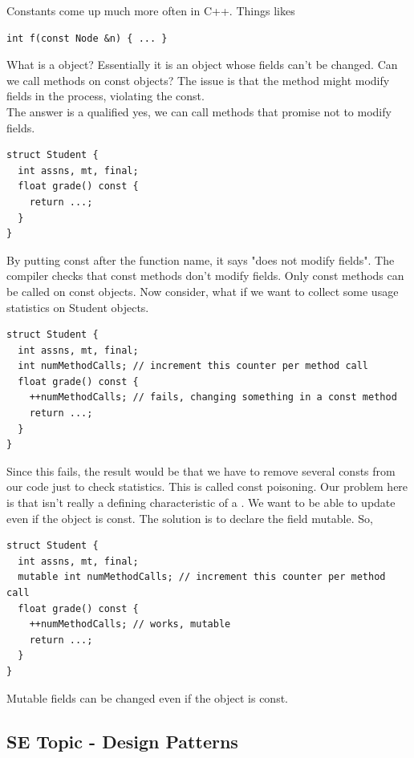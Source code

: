 \documentclass[english, 11pt]{article}
\begin{document}
Constants come up much more often in C++. Things likes
\begin{lstlisting}
int f(const Node &n) { ... }
\end{lstlisting}
What is a  object? Essentially it is an object whose fields can't be changed. Can we call methods on const objects? The issue is that the method might modify fields in the process, violating the const. \\

The answer is a qualified yes, we can call methods that promise not to modify fields.
\begin{lstlisting}
struct Student {
  int assns, mt, final;
  float grade() const {
    return ...;
  }
}
\end{lstlisting}
By putting const after the function name, it says "does not modify fields". The compiler checks that const methods don't modify fields. Only const methods can be called on const objects. Now consider, what if we want to collect some usage statistics on Student objects.
\begin{lstlisting}
struct Student {
  int assns, mt, final;
  int numMethodCalls; // increment this counter per method call
  float grade() const {
    ++numMethodCalls; // fails, changing something in a const method
    return ...;
  }
}
\end{lstlisting}
Since this fails, the result would be that we have to remove several consts from our code just to check statistics. This is called const poisoning. Our problem here is that  isn't really a defining characteristic of a . We want to be able to update  even if the object is const. The solution is to declare the field mutable. So,
\begin{lstlisting}
struct Student {
  int assns, mt, final;
  mutable int numMethodCalls; // increment this counter per method call
  float grade() const {
    ++numMethodCalls; // works, mutable
    return ...;
  }
}
\end{lstlisting}
Mutable fields can be changed even if the object is const.

\subsection{SE Topic - Design Patterns}
\end{document}
